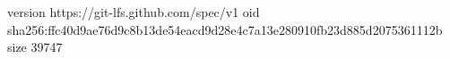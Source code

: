 version https://git-lfs.github.com/spec/v1
oid sha256:ffc40d9ae76d9c8b13de54eacd9d28e4c7a13e280910fb23d885d2075361112b
size 39747
